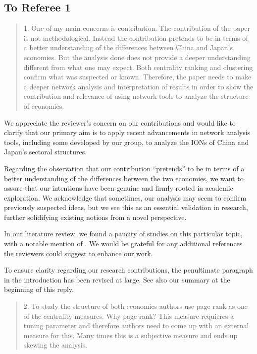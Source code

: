 \documentclass[12pt]{article}
\newenvironment{comment}%
{\begin{quotation}\noindent\small\it\color{darkblue}\ignorespaces%
}{\end{quotation}}
\begin{document}
\subsection*{To Referee 1}

\begin{comment}
1. One of my main concerns is contribution. The contribution of the paper is
 not methodological. Instead the contribution pretends to be in terms of a
better understanding of the differences between China and Japan's economies.
But the analysis done does not provide a deeper understanding different from
what one may expect. Both centrality ranking and clustering confirm what
was suspected or known. Therefore, the paper needs to make a deeper
network analysis and interpretation of results in order to show the
contribution and relevance of using network tools to analyze the
structure of economies.
\end{comment}


We appreciate the reviewer's concern on our contributions and would like to
clarify that our primary aim is to apply recent advancements in network analysis
tools, including some developed by our group, to analyze the IONs of China and
Japan's sectoral structures.


Regarding the observation that our contribution ``pretends'' to be in terms of a
better understanding of the differences between the two economies, we want to
assure that our intentions have been genuine and firmly rooted in academic
exploration. We acknowledge that sometimes, our analysis may seem to confirm
previously suspected ideas, but we see this as an essential validation in
research, further solidifying existing notions from a novel perspective.


In our literature review, we found a paucity of studies on this particular
topic, with a notable mention of \citet{li2017examining}. We would be grateful
for any additional references the reviewers could suggest to enhance our work.


To ensure clarity regarding our research contributions, the penultimate
paragraph in the introduction has been revised at large. See also our summary at
the beginning of this reply.


\begin{comment}
2. To study the structure of both economies authors use page rank as one of the
centrality measures. Why page rank? This measure requieres a tuning parameter
and therefore authors need to come up with an external measure for this. Many
times this is a subjective measure and ends up skewing the analysis.
\end{comment}
\end{document}

